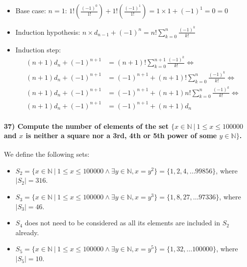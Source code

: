 \documentclass[
]{article}
\begin{document}
\begin{itemize}
\item
  Base case: \(n=1\):
  \(1!(\frac{(-1)^0}{1!}) + 1!(\frac{(-1)^1}{1!}) = 1 \times 1 + (-1)^1 = 0 = 0\)
\item
  Induction hypothesis:
  \(n \times d_{n-1} + (-1)^n = n! \sum_{k=0}^n \frac{(-1)^k}{k!}\)
\item
  Induction step: \[
  \begin{aligned}
  (n+1)d_{n} + (-1)^{n+1} &= (n+1)! \sum_{k=0}^{n+1} \frac{(-1)^k}{k!} \Leftrightarrow\\
  (n+1) d_n + (-1)^{n+1} &= (-1)^{n+1} + (n+1)!\sum_{k=0}^{n} \frac{(-1)^k}{k!}
  \Leftrightarrow \\ (n+1) d_n + (-1)^{n+1} &= 
  (-1)^{n+1} + (n+1) n! \sum_{k=0}^n \frac{(-1)^k}{k!} \Leftrightarrow\\ (n+1) d_n + (-1)^{n+1} &= (-1)^{n+1} +(n+1) d_n
  \end{aligned}
  \]
\end{itemize}

\hypertarget{compute-the-number-of-elements-of-the-set-x-in-mathbbn-1-leq-x-leq-100-000-and-x-is-neither-a-square-nor-a-3rd-4th-or-5th-power-of-some-y-in-mathbbn.}{%
\paragraph{\texorpdfstring{37) Compute the number of elements of the set
\(\{x \in \mathbb{N} \ | \ 1 \leq x \leq 100 000\) and \(x\) is neither
a square nor a 3rd, 4th or 5th power of some
\(y \in \mathbb{N}\}\).}{37) Compute the number of elements of the set \textbackslash\{x \textbackslash in \textbackslash mathbb\{N\} \textbackslash{} \textbar{} \textbackslash{} 1 \textbackslash leq x \textbackslash leq 100 000 and x is neither a square nor a 3rd, 4th or 5th power of some y \textbackslash in \textbackslash mathbb\{N\}\textbackslash\}.}}\label{compute-the-number-of-elements-of-the-set-x-in-mathbbn-1-leq-x-leq-100-000-and-x-is-neither-a-square-nor-a-3rd-4th-or-5th-power-of-some-y-in-mathbbn.}}

We define the following sets:

\begin{itemize}
\item
  \(S_2 = \{x \in \mathbb{N} \ | \ 1 \leq x \leq 100 000 \land \exists y \in \mathbb{N}, x = y^2\} = \{1,2,4, \dots 99856\}\),
  where \(|S_2| = 316\).
\item
  \(S_3 = \{x \in \mathbb{N} \ | \ 1 \leq x \leq 100 000 \land \exists y \in \mathbb{N}, x = y^3\} = \{1,8,27, \dots 97336\}\),
  where \(|S_3| = 46\).
\item
  \(S_4\) does not need to be considered as all its elements are
  included in \(S_2\) already.
\item
  \(S_5 = \{x \in \mathbb{N} \ | \ 1 \leq x \leq 100 000 \land \exists y \in \mathbb{N}, x = y^5\} = \{1,32, \dots 100 000\}\),
  where \(|S_5| = 10\).
\end{itemize}
\end{document}
